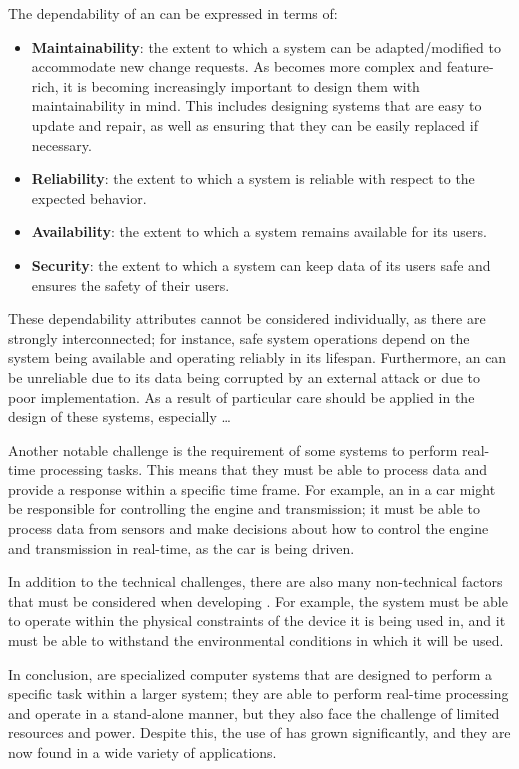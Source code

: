 The dependability of an \es can be expressed in terms of:
\begin{itemize}
    \item \textbf{Maintainability}: the extent to which a system can be adapted/modified to accommodate new change requests. As \ess becomes more complex and feature-rich, it is becoming increasingly important to design them with maintainability in mind. This includes designing systems that are easy to update and repair, as well as ensuring that they can be easily replaced if necessary.
    \item \textbf{Reliability}: the extent to which a system is reliable with respect to the expected behavior.
    \item \textbf{Availability}: the extent to which a system remains available for its users.
    \item \textbf{Security}: the extent to which a system can keep data of its users safe and ensures the safety of their users.
\end{itemize}

These dependability attributes cannot be considered individually, as there are strongly interconnected; for instance, safe system operations depend on the system being available and operating reliably in its lifespan. Furthermore, an \es can be unreliable due to its data being corrupted by an external attack or due to poor implementation. As a result of particular care should be applied in the design of these systems, especially \dots 



Another notable challenge is the requirement of some systems to perform real-time processing tasks. This means that they must be able to process data and provide a response within a specific time frame. For example, an \es in a car might be responsible for controlling the engine and transmission; it must be able to process data from sensors and make decisions about how to control the engine and transmission in real-time, as the car is being driven.

In addition to the technical challenges, there are also many non-technical factors that must be considered when developing \ess. For example, the system must be able to operate within the physical constraints of the device it is being used in, and it must be able to withstand the environmental conditions in which it will be used.

In conclusion, \ess are specialized computer systems that are designed to perform a specific task within a larger system; they are able to perform real-time processing and operate in a stand-alone manner, but they also face the challenge of limited resources and power. Despite this, the use of \ess has grown significantly, and they are now found in a wide variety of applications.





